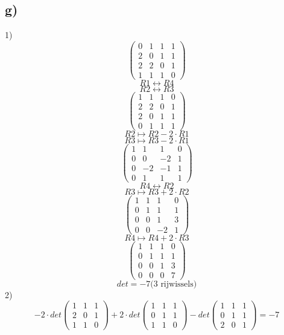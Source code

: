 \documentclass[10pt,a4paper]{article}
\begin{document}
\subsection*{g)}
1)
\[
\begin{pmatrix}
0 & 1 & 1 & 1\\
2 & 0 & 1 & 1\\
2 & 2 & 0 & 1\\
1 & 1 & 1 & 0
\end{pmatrix}
\]
\[R1 \leftrightarrow R4\]
\[R2 \leftrightarrow R3\]
\[
\begin{pmatrix}
1 & 1 & 1 & 0\\
2 & 2 & 0 & 1\\
2 & 0 & 1 & 1\\
0 & 1 & 1 & 1
\end{pmatrix}
\]
\[R2 \longmapsto R2- 2 \cdot R1 \]
\[R3 \longmapsto R3- 2 \cdot R1 \]
\[
\begin{pmatrix}
1 & 1 & 1 & 0\\
0 & 0 & -2 & 1\\
0 & -2 & -1 & 1\\
0 & 1 & 1 & 1
\end{pmatrix}
\]
\[R4 \leftrightarrow R2\]
\[R3 \longmapsto R3 + 2 \cdot R2\]
\[
\begin{pmatrix}
1 & 1 & 1 & 0\\
0 & 1 & 1 & 1\\
0 & 0 & 1 & 3\\
0 & 0 & -2 & 1
\end{pmatrix}
\]
\[R4 \longmapsto R4 + 2 \cdot R3\]
\[
\begin{pmatrix}
1 & 1 & 1 & 0\\
0 & 1 & 1 & 1\\
0 & 0 & 1 & 3\\
0 & 0 & 0 & 7
\end{pmatrix}
\]
\[det = -7 \text{(3 rijwissels)} \]
2)
\[ -2 \cdot det
\begin{pmatrix}
1 & 1 & 1\\
2 & 0 & 1\\
1 & 1 & 0
\end{pmatrix}
+2 \cdot det
\begin{pmatrix}
1 & 1 & 1\\
0 & 1 & 1\\
1 & 1 & 0
\end{pmatrix}
- det 
\begin{pmatrix}
1 & 1 & 1\\
0 & 1 & 1\\
2 & 0 & 1
\end{pmatrix}
=-7
\]
\end{document}
